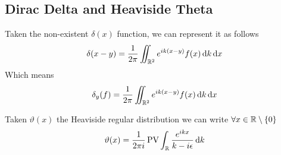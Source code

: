 \documentclass[../complete.tex]{subfiles}
\begin{document}
\subsection{Dirac Delta and Heaviside Theta}
\begin{thm}
	Taken the non-existent $\delta(x)$ function, we can represent it as follows
	\begin{equation}
		\delta(x-y)=\frac{1}{2\pi}\iint_{\mathbb{R}^2}^{}e^{ik(x-y)}f(x)\operatorname{d\!} k\operatorname{d\!} x
		\label{eq:deltafunction}
	\end{equation}
	Which means
	\begin{equation*}
		\delta_y(f)=\frac{1}{2\pi}\iint_{\mathbb{R}^2}e^{ik(x-y)}f(x)\operatorname{d\!} k\operatorname{d\!} x
	\end{equation*}
\end{thm}
\begin{thm}
	Taken $\vartheta(x)$ the Heaviside regular distribution we can write $\forall x\in\mathbb{R}\setminus\{0\}$
	\begin{equation}
		\vartheta(x)=\frac{1}{2\pi i}\operatorname{\mathrm{PV}}\int_{\mathbb{R}}^{}\frac{e^{ikx}}{k-i\epsilon}\operatorname{d\!} k
		\label{eq:varthetaintegral}
	\end{equation}
\end{thm}
\end{document}
